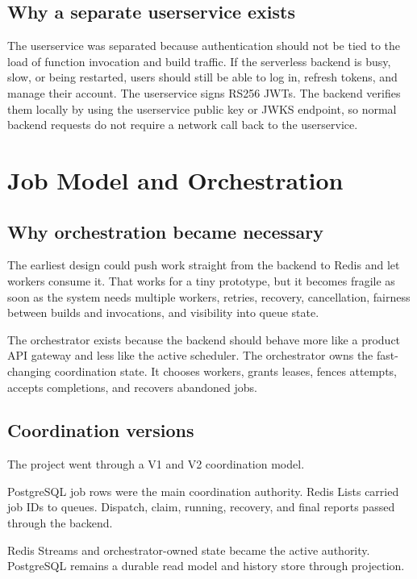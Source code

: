 \documentclass[12pt,a4paper]{report}
\begin{document}
\section{Why a separate userservice exists}

The userservice was separated because authentication should not be tied to the
load of function invocation and build traffic. If the serverless backend is
busy, slow, or being restarted, users should still be able to log in, refresh
tokens, and manage their account. The userservice signs RS256 JWTs. The backend
verifies them locally by using the userservice public key or JWKS endpoint, so
normal backend requests do not require a network call back to the userservice.

\clearpage

\chapter{Job Model and Orchestration}

\section{Why orchestration became necessary}

The earliest design could push work straight from the backend to Redis and let
workers consume it. That works for a tiny prototype, but it becomes fragile as
soon as the system needs multiple workers, retries, recovery, cancellation,
fairness between builds and invocations, and visibility into queue state.

The orchestrator exists because the backend should behave more like a product
API gateway and less like the active scheduler. The orchestrator owns the
fast-changing coordination state. It chooses workers, grants leases, fences
attempts, accepts completions, and recovers abandoned jobs.

\section{Coordination versions}

The project went through a V1 and V2 coordination model.

\begin{description}[leftmargin=2.6cm,style=nextline]
  \item[V1] PostgreSQL job rows were the main coordination authority. Redis
  Lists carried job IDs to queues. Dispatch, claim, running, recovery, and
  final reports passed through the backend.
  \item[V2] Redis Streams and orchestrator-owned state became the active
  authority. PostgreSQL remains a durable read model and history store through
  projection.
\end{description}
\end{document}
